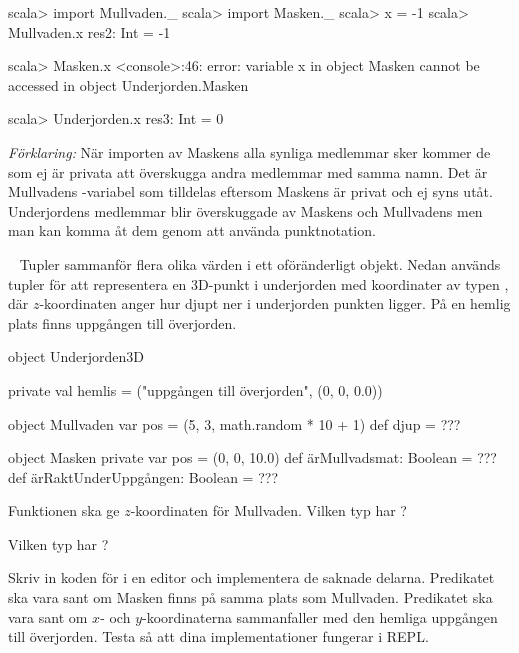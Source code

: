 \SubtaskSolved

\begin{REPL}
scala> import Mullvaden._
scala> import Masken._
scala> x = -1
scala> Mullvaden.x
res2: Int = -1

scala> Masken.x
<console>:46: error:
  variable x in object Masken cannot be accessed
  in object Underjorden.Masken

scala> Underjorden.x
res3: Int = 0
\end{REPL}

\noindent \emph{Förklaring:} När importen av Maskens alla synliga medlemmar sker kommer de som ej är privata att överskugga andra medlemmar med samma namn. Det är Mullvadens -variabel som tilldelas  eftersom Maskens  är privat och ej syns utåt. Underjordens medlemmar blir överskuggade av Maskens  och Mullvadens  men man kan komma åt dem genom att använda punktnotation.

\QUESTEND





\QUESTBEGIN

\Task \what~ Tupler sammanför flera olika värden i ett oföränderligt objekt. Nedan används tupler för att representera en 3D-punkt i underjorden med koordinater  av typen , där $z$-koordinaten anger hur djupt ner i underjorden punkten ligger. På en hemlig plats finns uppgången till överjorden.

\begin{Code}
object Underjorden3D {
  private val hemlis = ("uppgången till överjorden", (0, 0, 0.0))

  object Mullvaden {
    var pos = (5, 3, math.random * 10 + 1)
    def djup  = ???
  }

  object Masken {
    private var pos = (0, 0, 10.0)
    def ärMullvadsmat: Boolean = ???
    def ärRaktUnderUppgången: Boolean = ???
  }
}
\end{Code}

\Subtask Funktionen  ska ge $z$-koordinaten för Mullvaden. Vilken typ har ?

\Subtask Vilken typ har ?

\Subtask Skriv in koden för  i en editor och implementera de saknade delarna. Predikatet  ska vara sant om Masken finns på samma plats som Mullvaden. Predikatet   ska vara sant om $x$- och $y$-koordinaterna sammanfaller med den hemliga uppgången till överjorden. Testa så att dina implementationer fungerar i REPL.

